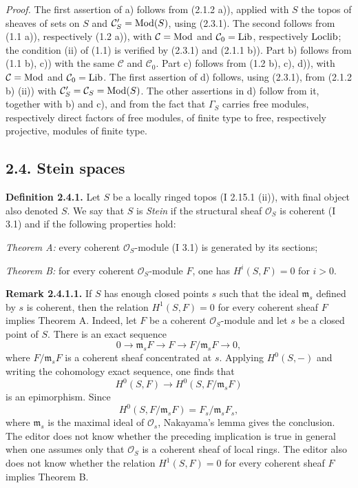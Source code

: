 \documentclass[11pt]{article}
\begin{document}
\emph{Proof.} The first assertion of a) follows from (2.1.2 a)), applied with $S$ the topos of sheaves of sets on $S$ and $\mathcal C'_S=\operatorname{Mod}(S)$, using (2.3.1). The second follows from (1.1 a)), respectively (1.2 a)), with $\mathcal C=\operatorname{Mod}$ and $\mathcal C_0=\operatorname{Lib}$, respectively $\operatorname{Loclib}$; the condition (ii) of (1.1) is verified by (2.3.1) and (2.1.1 b)). Part b) follows from (1.1 b), c)) with the same $\mathcal C$ and $\mathcal C_0$. Part c) follows from (1.2 b), c), d)), with $\mathcal C=\operatorname{Mod}$ and $\mathcal C_0=\operatorname{Lib}$. The first assertion of d) follows, using (2.3.1), from (2.1.2 b) (ii)) with $\mathcal C'_S=\mathcal C_S=\operatorname{Mod}(S)$. The other assertions in d) follow from it, together with b) and c), and from the fact that $\Gamma_S$ carries free modules, respectively direct factors of free modules, of finite type to free, respectively projective, modules of finite type.

\subsection*{2.4. Stein spaces}

\textbf{Definition 2.4.1.} Let $S$ be a locally ringed topos (I 2.15.1 (ii)), with final object also denoted $S$. We say that $S$ is \emph{Stein} if the structural sheaf $\mathcal O_S$ is coherent (I 3.1) and if the following properties hold:

\emph{Theorem A:} every coherent $\mathcal O_S$-module (I 3.1) is generated by its sections;

\emph{Theorem B:} for every coherent $\mathcal O_S$-module $F$, one has $H^i(S,F)=0$ for $i>0$.

\textbf{Remark 2.4.1.1.} If $S$ has enough closed points $s$ such that the ideal $\mathfrak m_s$ defined by $s$ is coherent, then the relation $H^1(S,F)=0$ for every coherent sheaf $F$ implies Theorem A. Indeed, let $F$ be a coherent $\mathcal O_S$-module and let $s$ be a closed point of $S$. There is an exact sequence
\[
0\longrightarrow \mathfrak m_sF\longrightarrow F\longrightarrow F/\mathfrak m_sF\longrightarrow0,
\]
where $F/\mathfrak m_sF$ is a coherent sheaf concentrated at $s$. Applying $H^0(S,-)$ and writing the cohomology exact sequence, one finds that
\[
H^0(S,F)\longrightarrow H^0(S,F/\mathfrak m_sF)
\]
is an epimorphism. Since
\[
H^0(S,F/\mathfrak m_sF)=F_s/\mathfrak m_sF_s,
\]
where $\mathfrak m_s$ is the maximal ideal of $\mathcal O_s$, Nakayama's lemma gives the conclusion. The editor does not know whether the preceding implication is true in general when one assumes only that $\mathcal O_S$ is a coherent sheaf of local rings. The editor also does not know whether the relation $H^1(S,F)=0$ for every coherent sheaf $F$ implies Theorem B.
\end{document}
